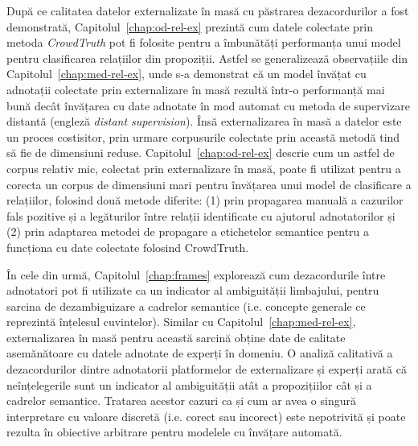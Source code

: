 După ce calitatea datelor externalizate în masă cu păstrarea dezacordurilor a fost demonstrată, Capitolul~\ref{chap:od-rel-ex} prezintă cum datele colectate prin metoda \textit{CrowdTruth} pot fi folosite pentru a îmbunătăți performanța unui model pentru clasificarea relațiilor din propoziții. Astfel se generalizează observațiile din Capitolul~\ref{chap:med-rel-ex}, unde s-a demonstrat că un model învățat cu adnotații colectate prin externalizare în masă rezultă într-o performanță mai bună decât învățarea cu date adnotate în mod automat cu metoda de supervizare distantă (engleză \textit{distant supervision}). Însă externalizarea în masă a datelor este un proces costisitor, prin urmare corpusurile colectate prin această metodă tind să fie de dimensiuni reduse. Capitolul~\ref{chap:od-rel-ex} descrie cum un astfel de corpus relativ mic, colectat prin externalizare în masă, poate fi utilizat pentru a corecta un corpus de dimensiuni mari pentru învățarea unui model de clasificare a relațiilor, folosind două metode diferite: (1) prin propagarea manuală a cazurilor fals pozitive și a legăturilor între relații identificate cu ajutorul adnotatorilor și (2) prin adaptarea metodei de propagare a etichetelor semantice pentru a funcționa cu date colectate folosind CrowdTruth.

În cele din urmă, Capitolul~\ref{chap:frames} explorează cum dezacordurile între adnotatori pot fi utilizate ca un indicator al ambiguității limbajului, pentru sarcina de dezambiguizare a cadrelor semantice (i.e. concepte generale ce reprezintă înțelesul cuvintelor). Similar cu Capitolul~\ref{chap:med-rel-ex}, externalizarea în masă pentru această sarcină obține date de calitate asemănătoare cu datele adnotate de experți în domeniu. O analiză calitativă a dezacordurilor dintre adnotatorii platformelor de externalizare și experți arată că neînțelegerile sunt un indicator al ambiguității atât a propozițiilor cât și a cadrelor semantice. Tratarea acestor cazuri ca și cum ar avea o singură interpretare cu valoare discretă (i.e. corect sau incorect) este nepotrivită și poate rezulta în obiective arbitrare pentru modelele cu învățare automată. 





